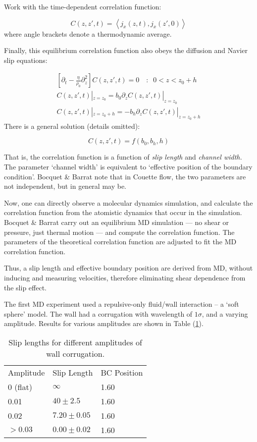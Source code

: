 \documentclass[12pt, a4paper, twoside, openright]{book}
\begin{document}
Work with the time-dependent correlation function:

\begin{equation}
C(z,z',t) = \left< j_{x}(z,t), j_{x}(z',0) \right>
\end{equation}
where angle brackets denote a thermodynamic average.

Finally, this equilibrium correlation function also obeys the diffusion and Navier slip equations:

\begin{gather}
\left[ \partial_{t} - \frac{\eta}{\rho_{0}} \partial_{z}^{2} \right]
C(z,z',t) = 0 \quad :\;\; 0<z<z_{0}+h 
\\
C(z,z',t)|_{z=z_{0}} = b_{0} \partial_{z} C(z,z',t)|_{z=z_{0}}
\\
C(z,z',t)|_{z=z_{0}+h} = -b_{h} \partial_{z} C(z,z',t)|_{z=z_{0}+h}
\end{gather}
There is a general solution (details omitted):

\begin{equation}
C(z,z',t) = f(b_{0}, b_{h}, h)
\end{equation}

That is, the correlation function is a function of \emph{slip length} and \emph{channel width.} The parameter `channel width' is equivalent to `effective position of the boundary condition'.  Bocquet \& Barrat note that in Couette flow, the two parameters are not independent, but in general may be.

Now, one can directly observe a molecular dynamics simulation, and calculate the correlation function from the atomistic dynamics that occur in the simulation. Bocquet \& Barrat carry out an equilibrium MD simulation --- no shear or pressure, just thermal motion --- and compute the correlation function.  The parameters of the theoretical correlation function are adjusted to fit the MD correlation function.

Thus, a slip length and effective boundary position are derived from MD, without inducing and measuring velocities, therefore eliminating  shear dependence from the slip effect.

The first MD experiment used a repulsive-only fluid/wall interaction -- a `soft sphere' model. The wall had a corrugation with wavelength of $1 \sigma$, and a varying amplitude.  Results for various amplitudes are shown in Table (\ref{t2}).


\begin{table}[h]
\centering
\caption{Slip lengths for different amplitudes of wall corrugation.} \label{t2}
\begin{tabular}{lll}
Amplitude      & Slip Length      & BC Position \\
0  (flat)      & $\infty$         & 1.60 \\
0.01           & $40 \pm 2.5$     & 1.60 \\
0.02           & $7.20 \pm 0.05$  & 1.60 \\
$>0.03$        & $0.00 \pm 0.02$  & 1.60 \\
\end{tabular}
\end{table}
\end{document}
